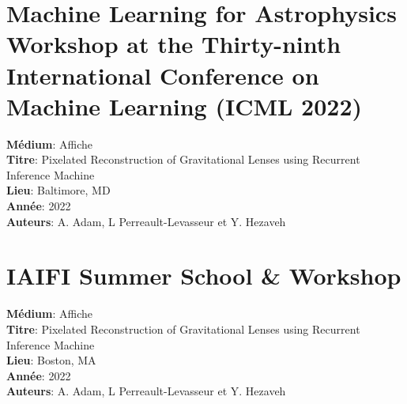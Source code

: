\section*{Machine Learning for Astrophysics
Workshop at the Thirty-ninth International Conference on Machine Learning (ICML 2022)}
\textbf{Médium}: Affiche\\
\textbf{Titre}: Pixelated Reconstruction of Gravitational Lenses using Recurrent Inference Machine \\
\textbf{Lieu}: Baltimore, MD\\
\textbf{Année}: 2022\\
\textbf{Auteurs}: A. Adam, L Perreault-Levasseur et Y. Hezaveh

\section*{IAIFI Summer School \& Workshop}
\textbf{Médium}: Affiche\\
\textbf{Titre}: Pixelated Reconstruction of Gravitational Lenses using Recurrent Inference Machine \\
\textbf{Lieu}: Boston, MA\\
\textbf{Année}: 2022\\
\textbf{Auteurs}: A. Adam, L Perreault-Levasseur et Y. Hezaveh


